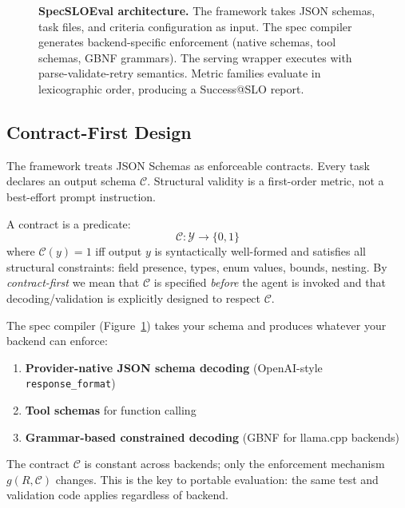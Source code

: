\documentclass[11pt]{article}
\begin{document}
\begin{figure}[t]
\caption{\textbf{SpecSLOEval architecture.} The framework takes JSON schemas, task files, and criteria configuration as input.  The spec compiler generates backend-specific enforcement (native schemas, tool schemas, GBNF grammars).  The serving wrapper executes with parse-validate-retry semantics.  Metric families evaluate in lexicographic order, producing a Success@SLO report.}
\label{fig:specsloeval-arch}
\end{figure}

\subsection{Contract-First Design}

The framework treats JSON Schemas as enforceable contracts.
Every task declares an output schema $\mathcal{C}$.
Structural validity is a first-order metric, not a best-effort prompt instruction.

A contract is a predicate:
\[
\mathcal{C} : \mathcal{Y} \rightarrow \{0, 1\}
\]
where $\mathcal{C}(y) = 1$ iff output $y$ is syntactically well-formed and satisfies all structural constraints: field presence, types, enum values, bounds, nesting.
By \emph{contract-first} we mean that $\mathcal{C}$ is specified \emph{before} the agent is invoked and that decoding/validation is explicitly designed to respect $\mathcal{C}$.

The spec compiler (Figure~\ref{fig:specsloeval-arch}) takes your schema and produces whatever your backend can enforce:
\begin{enumerate}[leftmargin=12pt]
    \item \textbf{Provider-native JSON schema decoding} (OpenAI-style \texttt{response\_format})
    \item \textbf{Tool schemas} for function calling
    \item \textbf{Grammar-based constrained decoding} (GBNF for llama.cpp backends)
\end{enumerate}

The contract $\mathcal{C}$ is constant across backends; only the enforcement mechanism $g(R, \mathcal{C})$ changes.
This is the key to portable evaluation: the same test and validation code applies regardless of backend.
\end{document}
